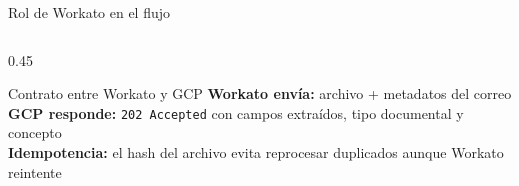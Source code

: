 \documentclass[aspectratio=169]{beamer}
\begin{document}
\begin{frame}{Rol de Workato en el flujo}
\begin{columns}[T]
\begin{column}{0.45\textwidth}
  \vspace{0.5cm}

  \begin{exampleblock}{Contrato entre Workato y GCP}
    \footnotesize
    \textbf{Workato envía:} archivo + metadatos del correo\\[3pt]
    \textbf{GCP responde:} \texttt{202 Accepted} con campos extraídos, tipo documental y concepto\\[3pt]
    \textbf{Idempotencia:} el hash del archivo evita reprocesar duplicados aunque Workato reintente
  \end{exampleblock}
\end{column}
\end{columns}
\end{frame}

\end{document}
